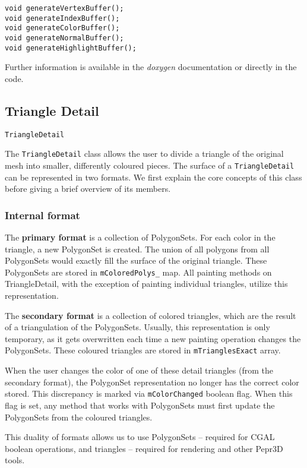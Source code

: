 \begin{lstlisting}
void generateVertexBuffer();
void generateIndexBuffer();
void generateColorBuffer();
void generateNormalBuffer();
void generateHighlightBuffer();
\end{lstlisting}

Further information is available in the \textit{doxygen} documentation or directly in the code.

\subsection{Triangle Detail}

\texttt{TriangleDetail}

The \texttt{TriangleDetail} class allows the user to divide a triangle of the original mesh into smaller, differently coloured pieces. The surface of a \texttt{TriangleDetail} can be represented in two formats. We first explain the core concepts of this class before giving a brief overview of its members.

\subsubsection{Internal format}

The \textbf{primary format} is a collection of PolygonSets. For each color in the triangle, a new PolygonSet is created. The union of all polygons from all PolygonSets would exactly fill the surface of the original triangle. These PolygonSets are stored in \texttt{mColoredPolys\_} map. All painting methods on TriangleDetail, with the exception of painting individual triangles, utilize this representation. 

The \textbf{secondary format} is a collection of colored triangles, which are the result of a triangulation of the PolygonSets. Usually, this representation is only temporary, as it gets overwritten each time a new painting operation changes the PolygonSets. These coloured triangles are stored in \texttt{mTrianglesExact} array.

When the user changes the color of one of these detail triangles (from the secondary format), the PolygonSet representation no longer has the correct color stored. This discrepancy is marked via \texttt{mColorChanged} boolean flag. When this flag is set, any method that works with PolygonSets must first update the PolygonSets from the coloured triangles.

This duality of formats allows us to use PolygonSets -- required for CGAL boolean operations, and triangles -- required for rendering and other Pepr3D tools.

